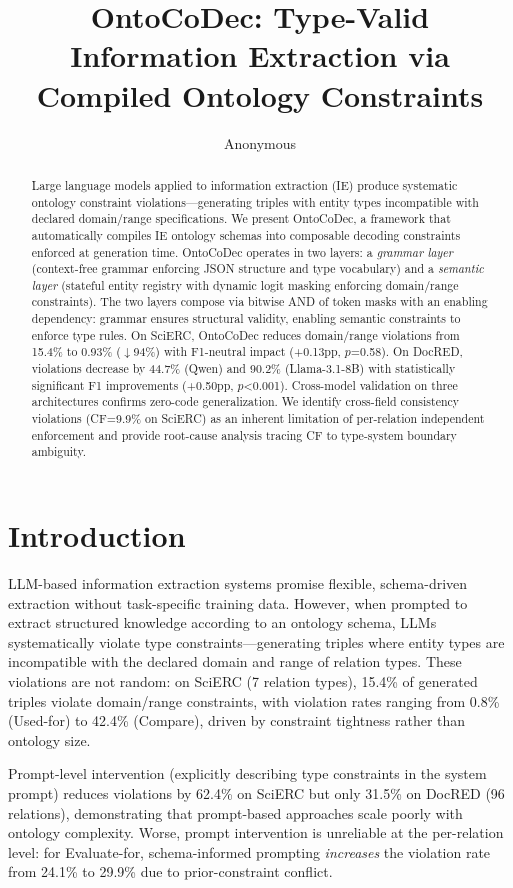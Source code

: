 \documentclass[11pt]{article}
\title{OntoCoDec: Type-Valid Information Extraction via Compiled Ontology Constraints}
\author{Anonymous}
\begin{document}
\maketitle

\begin{abstract}
Large language models applied to information extraction (IE) produce systematic ontology constraint violations---generating triples with entity types incompatible with declared domain/range specifications. We present OntoCoDec, a framework that automatically compiles IE ontology schemas into composable decoding constraints enforced at generation time. OntoCoDec operates in two layers: a \emph{grammar layer} (context-free grammar enforcing JSON structure and type vocabulary) and a \emph{semantic layer} (stateful entity registry with dynamic logit masking enforcing domain/range constraints). The two layers compose via bitwise AND of token masks with an enabling dependency: grammar ensures structural validity, enabling semantic constraints to enforce type rules. On SciERC, OntoCoDec reduces domain/range violations from 15.4\% to 0.93\% ($\downarrow$94\%) with F1-neutral impact (+0.13pp, $p$=0.58). On DocRED, violations decrease by 44.7\% (Qwen) and 90.2\% (Llama-3.1-8B) with statistically significant F1 improvements (+0.50pp, $p$<0.001). Cross-model validation on three architectures confirms zero-code generalization. We identify cross-field consistency violations (CF=9.9\% on SciERC) as an inherent limitation of per-relation independent enforcement and provide root-cause analysis tracing CF to type-system boundary ambiguity.
\end{abstract}

\section{Introduction}

LLM-based information extraction systems promise flexible, schema-driven extraction without task-specific training data. However, when prompted to extract structured knowledge according to an ontology schema, LLMs systematically violate type constraints---generating triples where entity types are incompatible with the declared domain and range of relation types. These violations are not random: on SciERC (7 relation types), 15.4\% of generated triples violate domain/range constraints, with violation rates ranging from 0.8\% (Used-for) to 42.4\% (Compare), driven by constraint tightness rather than ontology size.

Prompt-level intervention (explicitly describing type constraints in the system prompt) reduces violations by 62.4\% on SciERC but only 31.5\% on DocRED (96 relations), demonstrating that prompt-based approaches scale poorly with ontology complexity. Worse, prompt intervention is unreliable at the per-relation level: for Evaluate-for, schema-informed prompting \emph{increases} the violation rate from 24.1\% to 29.9\% due to prior-constraint conflict.
\end{document}
